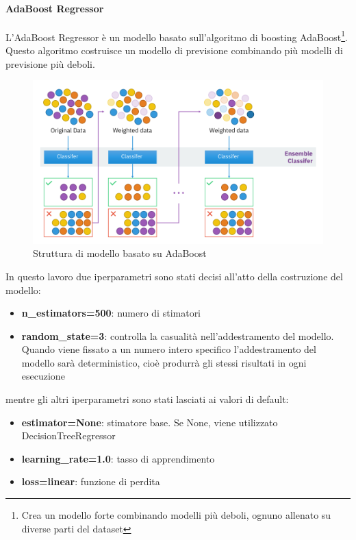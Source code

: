 \paragraph{AdaBoost Regressor}
L'AdaBoost Regressor è un modello basato sull'algoritmo di boosting AdaBoost\footnote{Crea un modello forte combinando modelli più deboli, ognuno allenato su diverse parti del dataset}{}. Questo algoritmo costruisce un modello di previsione combinando più modelli di previsione più deboli.
\begin{figure}[H]
    \centering
    \includegraphics[scale=0.5]{images/AdaBoost.png}
    \caption{Struttura di modello basato su AdaBoost}
\end{figure}

\noindent In questo lavoro due iperparametri sono stati decisi all'atto della costruzione del modello:

\begin{itemize}
    \item \textbf{n\_estimators=500}: numero di stimatori
    \item \textbf{random\_state=3}:  controlla la casualità nell'addestramento del modello. Quando viene fissato a un numero intero specifico l'addestramento del modello sarà deterministico, cioè produrrà gli stessi risultati in ogni esecuzione
\end{itemize}

\noindent mentre gli altri iperparametri sono stati lasciati ai valori di default:
\begin{itemize}
    \item \textbf{estimator=None}: stimatore base. Se None, viene utilizzato DecisionTreeRegressor
    \item \textbf{learning\_rate=1.0}: tasso di apprendimento
    \item \textbf{loss=linear}: funzione di perdita
\end{itemize}
